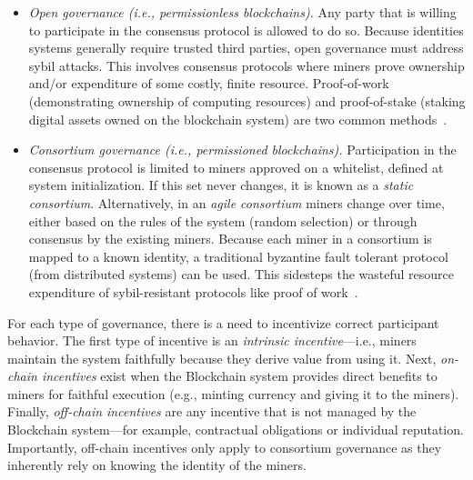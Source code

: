 \begin{itemize}

	\item \emph{Open governance (i.e., permissionless blockchains).}
	Any party that is willing to participate in the consensus protocol is allowed to do so.
	Because identities systems generally require trusted third parties, open governance must address sybil attacks. This involves consensus protocols where miners prove ownership and/or expenditure of some costly, finite resource.
	Proof-of-work (demonstrating ownership of computing resources) and proof-of-stake (staking  digital assets owned on the blockchain system) are two common methods~\cite{Bano17,garay2018consensus}.
	
	\item \emph{Consortium governance (i.e., permissioned blockchains).}
	Participation in the consensus protocol is limited to miners approved on a whitelist, defined at system initialization.
	If this set never changes, it is known as a \emph{static consortium}.
	Alternatively, in an \emph{agile consortium} miners change over time, either based on the rules of the system (\eg random selection) or through consensus by the existing miners.
	Because each miner in a consortium is mapped to a known identity, a traditional byzantine fault tolerant protocol (from distributed systems) can be used. This sidesteps the wasteful resource expenditure of sybil-resistant protocols like proof of work~\cite{Bano17,garay2018consensus}.
	
\end{itemize}

For each type of governance, there is a need to incentivize correct participant behavior.
The first type of incentive is an \emph{intrinsic incentive}---i.e., miners maintain the system faithfully because they derive value from using it. Next, \emph{on-chain incentives} exist when the Blockchain system provides direct benefits to miners for faithful execution (e.g., minting currency and giving it to the miners). Finally, \emph{off-chain incentives} are any incentive that is not managed by the Blockchain system---for example, contractual obligations or individual reputation.
Importantly, off-chain incentives only apply to consortium governance as they inherently rely on knowing the identity of the miners.


